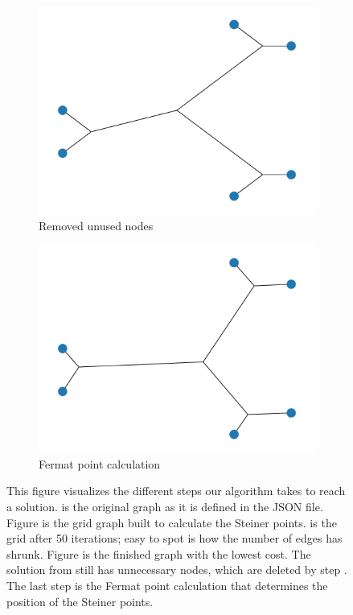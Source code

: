 \begin{figure}[H]
    \begin{subfigure}{0.32\linewidth}
        \centering
        \includegraphics[width=\linewidth]{figures/algo_progress/unused_nodes_default.pdf}
        \caption{Removed unused nodes}
        \label{fig:def_4}
    \end{subfigure}
    \begin{subfigure}{0.32\linewidth}
        \centering
        \includegraphics[width=\linewidth]{figures/algo_progress/fermat_default.pdf}
        \caption{Fermat point calculation}
        \label{fig:def_5}
    \end{subfigure}
  \caption{This figure visualizes the different steps our algorithm takes to reach a solution.  is the original graph as it is defined in the JSON file. Figure  is the grid graph built to calculate the Steiner points.  is the grid after 50 iterations; easy to spot is how the number of edges has shrunk. Figure  is the finished graph with the lowest cost. The solution from  still has unnecessary nodes, which are deleted by step . The last step  is the Fermat point calculation that determines the position of the Steiner points.}
  \label{fig:default_combined}
\end{figure}

